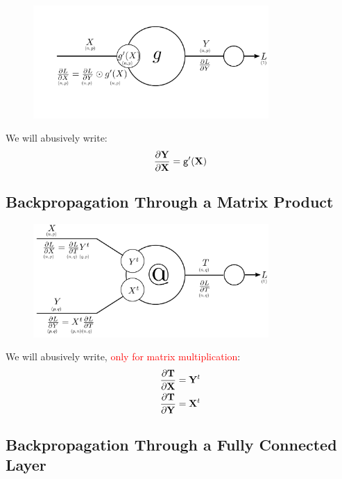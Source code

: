 \documentclass{book}
\newcommand{\X}{\mathbf{X}}
\newcommand{\Y}{\mathbf{Y}}
\newcommand{\act}{\texttt{g}}%
\newcommand{\alert}[1]{\textcolor{red}{#1}}
\begin{document}
\begin{figure}[h]
    \centering
    \includegraphics[width=0.8\textwidth]{bp_activation_2.png}
\end{figure}

\begin{myblock}{}
We will abusively write:
\[
\pdv{\Y}{\X} = \act'(\X)
\]
\end{myblock}

\subsection{Backpropagation Through a Matrix Product}

\begin{figure}[h]
    \centering
    \includegraphics[width=0.8\textwidth]{matrix_mult_4.png}
\end{figure}

\begin{myblock}{}
We will abusively write, \alert{only for matrix multiplication}:
\begin{align*}
\pdv{\mathbf{T}}{\X} &= \Y^t \\
\pdv{\mathbf{T}}{\Y} &= \X^t
\end{align*}
\end{myblock}

\subsection{Backpropagation Through a Fully Connected Layer}
\end{document}

